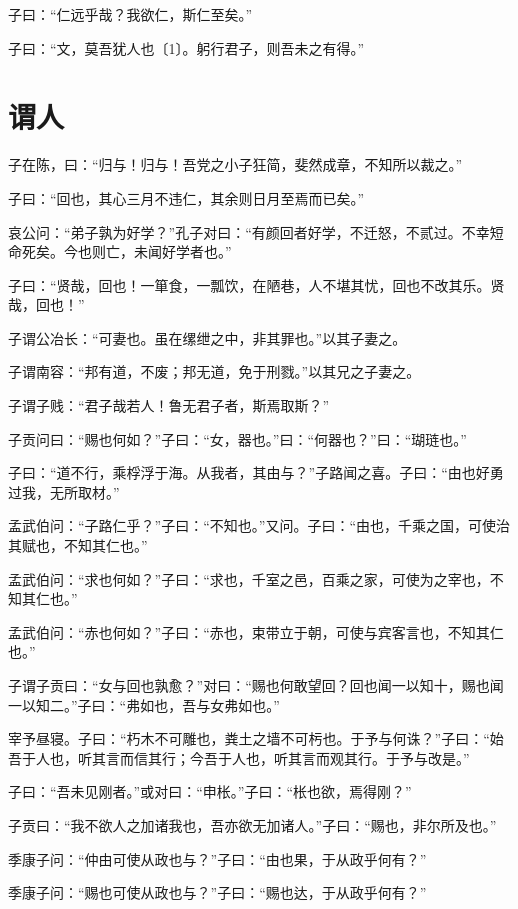 \documentclass[a5paper]{ctexbook}
\begin{document}
    子曰：“仁远乎哉？我欲仁，斯仁至矣。”

    子曰：“文，莫吾犹人也〔1〕。躬行君子，则吾未之有得。”

    \chapter{谓人}

    子在陈，曰：“归与！归与！吾党之小子狂简，斐然成章，不知所以裁之。”

    子曰：“回也，其心三月不违仁，其余则日月至焉而已矣。”

    哀公问：“弟子孰为好学？”孔子对曰：“有颜回者好学，不迁怒，不贰过。不幸短命死矣。今也则亡，未闻好学者也。”

    子曰：“贤哉，回也！一箪食，一瓢饮，在陋巷，人不堪其忧，回也不改其乐。贤哉，回也！”

    子谓公冶长：“可妻也。虽在缧绁之中，非其罪也。”以其子妻之。

    子谓南容：“邦有道，不废；邦无道，免于刑戮。”以其兄之子妻之。

    子谓子贱：“君子哉若人！鲁无君子者，斯焉取斯？”

    子贡问曰：“赐也何如？”子曰：“女，器也。”曰：“何器也？”曰：“瑚琏也。”

    子曰：“道不行，乘桴浮于海。从我者，其由与？”子路闻之喜。子曰：“由也好勇过我，无所取材。”

    孟武伯问：“子路仁乎？”子曰：“不知也。”又问。子曰：“由也，千乘之国，可使治其赋也，不知其仁也。”
    
    孟武伯问：“求也何如？”子曰：“求也，千室之邑，百乘之家，可使为之宰也，不知其仁也。”
    
    孟武伯问：“赤也何如？”子曰：“赤也，束带立于朝，可使与宾客言也，不知其仁也。”

    子谓子贡曰：“女与回也孰愈？”对曰：“赐也何敢望回？回也闻一以知十，赐也闻一以知二。”子曰：“弗如也，吾与女弗如也。”

    宰予昼寝。子曰：“朽木不可雕也，粪土之墙不可杇也。于予与何诛？”子曰：“始吾于人也，听其言而信其行；今吾于人也，听其言而观其行。于予与改是。”

    子曰：“吾未见刚者。”或对曰：“申枨。”子曰：“枨也欲，焉得刚？”

    子贡曰：“我不欲人之加诸我也，吾亦欲无加诸人。”子曰：“赐也，非尔所及也。”

    季康子问：“仲由可使从政也与？”子曰：“由也果，于从政乎何有？”
    
    季康子问：“赐也可使从政也与？”子曰：“赐也达，于从政乎何有？”
    
\end{document}

